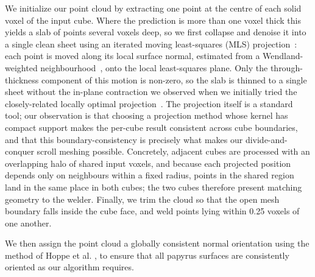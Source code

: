We initialize our point cloud by extracting one point at the centre of each solid voxel of the input cube. Where the prediction is more than one voxel thick this yields a slab of points several voxels deep, so we first collapse and denoise it into a single clean sheet using an iterated moving least-squares (MLS) projection~\cite{levin2003mesh}: each point is moved along its local surface normal, estimated from a Wendland-weighted neighbourhood~\cite{wendland1995piecewise}, onto the local least-squares plane. Only the through-thickness component of this motion is non-zero, so the slab is thinned to a single sheet without the in-plane contraction we observed when we initially tried the closely-related locally optimal projection~\cite{lipman2007parameterization}. The projection itself is a standard tool; our observation is that choosing a projection method whose kernel has compact support makes the per-cube result consistent across cube boundaries, and that this boundary-consistency is precisely what makes our divide-and-conquer scroll meshing possible. Concretely, adjacent cubes are processed with an overlapping halo of shared input voxels, and because each projected position depends only on neighbours within a fixed radius, points in the shared region land in the same place in both cubes; the two cubes therefore present matching geometry to the welder. Finally, we trim the cloud so that the open mesh boundary falls inside the cube face, and weld points lying within 0.25 voxels of one another.

We then assign the point cloud a globally consistent normal orientation using the method of Hoppe et al. , to ensure that all papyrus surfaces are consistently oriented as our algorithm requires. 

